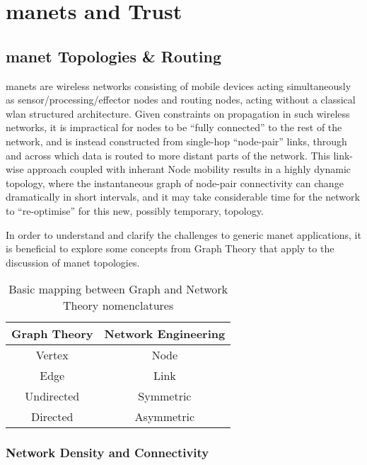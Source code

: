 \chapter{\glspl{manet} and Trust}
\label{ch:trust_background}

\section{\acrlong{manet} Topologies \& Routing}\label{sec:manet_topologies}

\glspl{manet} are wireless networks consisting of mobile devices acting simultaneously as sensor/processing/effector nodes and routing nodes, acting without a classical \gls{wlan} structured architecture. 
Given constraints on propagation in such wireless networks, it is impractical for nodes to be ``fully connected'' to the rest of the network, and is instead constructed from single-hop ``node-pair'' links, through and across which data is routed to more distant parts of the network.
This link-wise approach coupled with inherant Node mobility results in a highly dynamic topology, where the instantaneous graph of node-pair connectivity can change dramatically in short intervals, and it may take considerable time for the network to ``re-optimise'' for this new, possibly temporary, topology. 

In order to understand and clarify the challenges to generic \gls{manet} applications, it is beneficial to explore some concepts from Graph Theory that apply to the discussion of \gls{manet} topologies. 


\begin{table} 
	\centering
	\begin{tabular}{cc}
		\toprule
		Graph Theory & Network Engineering\\
		\midrule
		Vertex & Node\\
		Edge & Link\\
		Undirected & Symmetric\\
		Directed & Asymmetric\\
		\bottomrule
	\end{tabular}
	\caption{Basic mapping between Graph and Network Theory nomenclatures}
\end{table}

\subsection{Network Density and Connectivity}\label{sec:connectivity}

